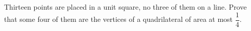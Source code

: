 Thirteen points are placed in a unit square, no three of them on a line. Prove that some four of them are the vertices of a quadrilateral of area at most $\dfrac{1}{4}$.
